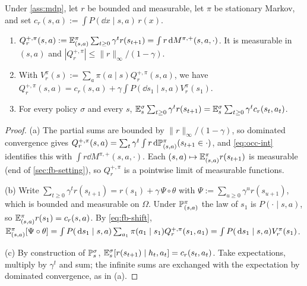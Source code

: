 \begin{lemma}\label{lem:fb-q}
Under \cref{ass:mdp}, let $r$ be bounded and measurable, let $\pi$ be stationary Markov, and set $c_r(s,a):=\int P(\dd x\mid s,a)\,r(x)$.
\begin{enumerate}[nosep,label=(\alph*)]
\item $Q^{+,\pi}_r(s,a):=\mathbb{E}^\pi_{(s,a)}\sum_{t\ge0}\gamma^tr(s_{t+1})=\int r\,\mathrm{d} M^{\pi,+}(s,a,\cdot)$.
  It is measurable in $(s,a)$ and $|Q^{+,\pi}_r|\le\|r\|_\infty/(1-\gamma)$.
\item With $V^\pi_r(s):=\sum_a\pi(a\mid s)Q^{+,\pi}_r(s,a)$, we have $Q^{+,\pi}_r(s,a)=c_r(s,a)+\gamma\int P(\dd s_1\mid s,a)V^\pi_r(s_1)$.
\item For every policy $\sigma$ and every $s$, $\mathbb{E}^\sigma_s\sum_{t\ge0}\gamma^tr(s_{t+1})=\mathbb{E}^\sigma_s\sum_{t\ge0}\gamma^tc_r(s_t,a_t)$.
\end{enumerate}
\end{lemma}
\begin{proof}
(a) The partial sums are bounded by $\|r\|_\infty/(1-\gamma)$, so dominated convergence gives
$Q^{+,\pi}_r(s,a)=\sum_t\gamma^t\int r\,\mathrm{d}\mathbb{P}^\pi_{(s,a)}(s_{t+1}\in\cdot)$, and \eqref{eq:occ-int} identifies this with $\int r\dd M^{\pi,+}(s,a,\cdot)$.
Each $(s,a)\mapsto\mathbb{E}^\pi_{(s,a)}r(s_{t+1})$ is measurable (end of \cref{sec:fb-setting}), so $Q^{+,\pi}_r$ is a pointwise limit of measurable functions.

(b) Write $\sum_{t\ge0}\gamma^tr(s_{t+1})=r(s_1)+\gamma\,\Psi\circ\theta$ with $\Psi:=\sum_{u\ge0}\gamma^ur(s_{u+1})$, which is bounded and measurable on $\Omega$.
Under $\mathbb{P}^\pi_{(s,a)}$ the law of $s_1$ is $P(\cdot\mid s,a)$, so $\mathbb{E}^\pi_{(s,a)}r(s_1)=c_r(s,a)$.
By \eqref{eq:fb-shift}, $\mathbb{E}^\pi_{(s,a)}[\Psi\circ\theta]=\int P(\,\mathrm{d} s_1\mid s,a)\sum_{a_1}\pi(a_1\mid s_1)Q^{+,\pi}_r(s_1,a_1)=\int P(\,\mathrm{d} s_1\mid s,a)V^\pi_r(s_1)$.

(c) By construction of $\mathbb{P}^\sigma_s$, $\mathbb{E}^\sigma_s[r(s_{t+1})\mid h_t,a_t]=c_r(s_t,a_t)$.
Take expectations, multiply by $\gamma^t$ and sum; the infinite sums are exchanged with the expectation by dominated convergence, as in (a).
\end{proof}


